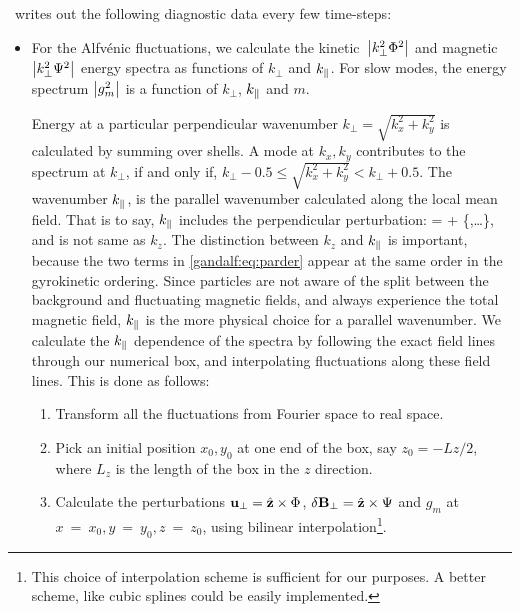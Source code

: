         \Gand\ writes out the following diagnostic data every few time-steps:
        \begin{itemize}
            \item For the Alfv\'{e}nic fluctuations, we calculate the kinetic~$\left|k_\perp^2 \Phi^2\right|$ and 
            magnetic~$\left|k_\perp^2 \Psi^2 \right|$ energy spectra as functions of $k_\perp$ and
            $k_\parallel$. For slow modes, the energy spectrum $\left|g_m^2\right|$ is a function of $k_\perp$, $k_\parallel$
            and $m$. 
            
            Energy at a particular perpendicular wavenumber $k_\perp = \sqrt{k_x^2 +
            k_y^2}$ is calculated by summing over shells. A mode at $k_x, k_y$
            contributes to the spectrum at $k_\perp$, if and only if, $k_\perp-0.5 \leq
            \sqrt{k_x^2 + k_y^2} < k_\perp+0.5$. The wavenumber $k_\parallel$, is the parallel
            wavenumber calculated along
            the local mean field. That is to say, $k_\parallel$ includes the perpendicular
            perturbation:
            \beq
                \cdot\nabla =  + \lt\{\Psi,\ldots\rt\},
                \label{gandalf:eq:parder}
            \eeq
            and is not same as $k_z$. The distinction between $k_z$ and $k_\parallel$ is
            important, because the two terms in
            \eqref{gandalf:eq:parder} appear at the same
            order in the gyrokinetic ordering. Since particles are not aware of the split
            between the background and fluctuating magnetic fields, and always experience
            the total magnetic field,
            $k_\parallel$ is the more physical choice for a parallel wavenumber.
            We calculate the $k_\parallel$ dependence of the spectra by following the exact
            field lines through our numerical box, and interpolating fluctuations along
            these field lines. This is done as follows:
            \begin{enumerate}
                \item Transform all the fluctuations from Fourier space to real space.

                \item Pick an initial position $x_0, y_0$ at one end of the box, say
                $z_0= - Lz/2$, where $L_z$ is the length of the box in the $z$ direction.

                \item Calculate the perturbations $\mathbf{u}_\perp =
                \hat{\mathbf{z}}\times\Phi$, $\mathbf{\delta B_\perp} =
                \hat{\mathbf{z}}\times\Psi$ and $g_m$  at $x~=~x_0, y~=~y_0, z~=~z_0$, using
                bilinear interpolation\footnote{This choice of interpolation scheme is
                sufficient for our purposes. A better scheme, like cubic splines could be
                easily implemented.}.


\end{enumerate}
\end{itemize}
